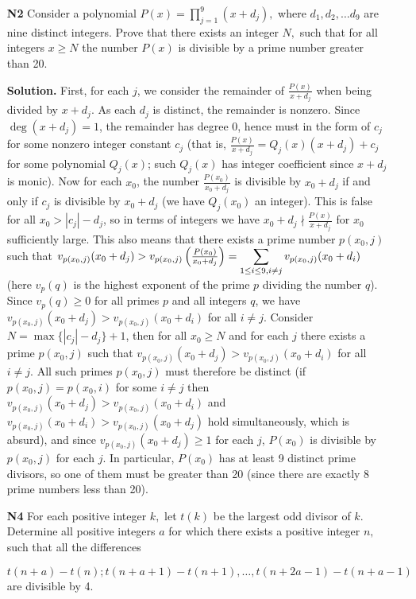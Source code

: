 \documentclass[11pt,a4paper]{article}
\begin{document}
\begin{enumerate}
	\item[\textbf{N2}] Consider a polynomial $P(x) =  \prod^9_{j=1}(x+d_j),$ where $d_1, d_2, \ldots d_9$ are nine distinct integers. Prove that there exists an integer $N,$ such that for all integers $x \geq N$ the number $P(x)$ is divisible by a prime number greater than 20.
	
	\textbf{Solution.} First, for each $j$, we consider the remainder of $\frac{P(x)}{x+d_j}$ when being divided by $x+d_j$. As each $d_j$ is distinct, the remainder is nonzero. Since $\deg(x+d_j)=1$, the remainder has degree 0, hence must in the form of $c_j$ for some nonzero integer constant $c_j$ (that is, $\frac{P(x)}{x+d_j}=Q_j(x)(x+d_j)+c_j$ for some polynomial $Q_j(x)$; such $Q_j(x)$ has integer coefficient since $x+d_j$ is monic). Now for each $x_0$, the number $\frac{P(x_0)}{x_0+d_j}$ is divisible by $x_0+d_j$ if and only if $c_j$ is divisible by $x_0+d_j$ (we have $Q_j(x_0)$ an integer). This is false for all $x_0>|c_j|-d_j$, so in terms of integers we have $x_0+d_j\nmid \frac{P(x)}{x+d_j}$ for $x_0$ sufficiently large. This also means that there exists a prime number $p(x_0, j)$ such that $v_{p(x_0, j)}(x_0+d_j)> v_{p(x_0, j)}\left(\frac{P(x_0)}{x_0+d_j}\right)=\displaystyle\sum_{1\le i\le 9, i\neq j} v_{p(x_0, j)}(x_0+d_i)$ (here $v_p(q)$ is the highest exponent of the prime $p$ dividing the number $q$). 
	Since $v_p(q)\ge 0$ for all primes $p$ and all integers $q$, we have $v_{p(x_0, j)}(x_0+d_j)>v_{p(x_0, j)}(x_0+d_i)$ for all $i\neq j$. 
	Consider $N=\max\{|c_j|-d_j\}+1$, then for all $x_0\ge N$ and for each $j$ there exists a prime $p(x_0, j)$ such that $v_{p(x_0, j)}(x_0+d_j)>v_{p(x_0, j)}(x_0+d_i)$ for all $i\neq j$. 
	All such primes $p(x_0, j)$ must therefore be distinct (if $p(x_0, j)=p(x_0, i)$ for some $i\neq j$ then $v_{p(x_0, j)}(x_0+d_j)>v_{p(x_0, j)}(x_0+d_i)$ and $v_{p(x_0, j)}(x_0+d_i)>v_{p(x_0, j)}(x_0+d_j)$ hold simultaneously, which is absurd), and since $v_{p(x_0, j)}(x_0+d_j)\ge 1$ for each $j$, $P(x_0)$ is divisible by $p(x_0, j)$ for each $j$. In particular, $P(x_0)$ has at least 9 distinct prime divisors, so one of them must be greater than 20 (since there are exactly 8 prime numbers less than 20). 
	
	\item[\textbf{N4}] For each positive integer $k,$ let $t(k)$ be the largest odd divisor of $k.$ Determine all positive integers $a$ for which there exists a positive integer $n,$ such that all the differences
	
	\[t(n+a)-t(n); t(n+a+1)-t(n+1), \ldots, t(n+2a-1)-t(n+a-1)\] are divisible by 4.
	

\end{enumerate}
\end{document}
